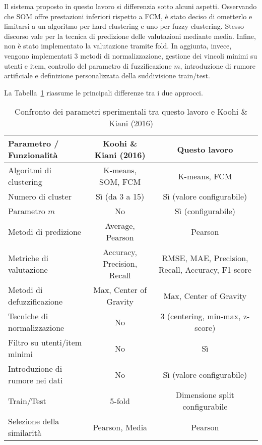 Il sistema proposto in questo lavoro si differenzia sotto alcuni aspetti. Osservando che SOM offre prestazioni inferiori rispetto a FCM, è stato deciso di ometterlo e limitarsi a un algoritmo per hard clustering e uno per fuzzy clustering. Stesso discorso vale per la tecnica di predizione delle valutazioni mediante media. Infine, non è stato implementato la valutazione tramite fold. In aggiunta, invece, vengono implementati 3 metodi di normalizzazione, gestione dei vincoli minimi su utenti e item, controllo del parametro di fuzzificazione \( m \), introduzione di rumore artificiale e definizione personalizzata della suddivisione train/test.

La Tabella~\ref{tab:confronto_parametri} riassume le principali differenze tra i due approcci.

\begin{table}[H]
\centering
\caption{Confronto dei parametri sperimentali tra questo lavoro e Koohi \& Kiani (2016)}
\label{tab:confronto_parametri}
\begin{tabular}{|l|c|c|}
\hline
\textbf{Parametro / Funzionalità} & \textbf{Koohi \& Kiani (2016)} & \textbf{Questo lavoro} \\
\hline
Algoritmi di clustering & K-means, SOM, FCM & K-means, FCM \\
\hline
Numero di cluster & Sì (da 3 a 15) & Sì (valore configurabile) \\
\hline
Parametro $m$ & No & Sì (configurabile) \\
\hline
Metodi di predizione & Average, Pearson & Pearson \\
\hline
Metriche di valutazione & Accuracy, Precision, Recall & RMSE, MAE, Precision, Recall, Accuracy, F1-score \\
\hline
Metodi di defuzzificazione & Max, Center of Gravity & Max, Center of Gravity \\
\hline
Tecniche di normalizzazione & No & 3 (centering, min-max, z-score) \\
\hline
Filtro su utenti/item minimi & No & Sì \\
\hline
Introduzione di rumore nei dati & No & Sì (valore configurabile) \\
\hline
Train/Test & 5-fold & Dimensione split configurabile \\
\hline
Selezione della similarità & Pearson, Media & Pearson \\
\hline
\end{tabular}
\end{table}
